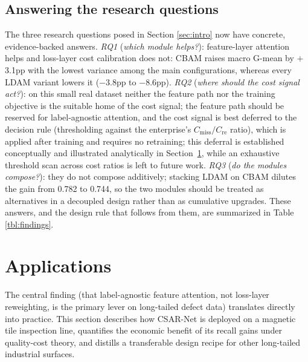 \documentclass[a4paper,fleqn]{cas-sc}
\begin{document}
\begin{sloppypar}
	\subsection{Answering the research questions}
	\par{
		The three research questions posed in Section \ref{sec:intro} now have concrete, evidence-backed answers. \emph{RQ1} (\emph{which module helps?}): feature-layer attention helps and loss-layer cost calibration does not: CBAM raises macro G-mean by $+$3.1pp with the lowest variance among the main configurations, whereas every LDAM variant lowers it ($-$3.8pp to $-$8.6pp). \emph{RQ2} (\emph{where should the cost signal act?}): on this small real dataset neither the feature path nor the training objective is the suitable home of the cost signal; the feature path should be reserved for label-agnostic attention, and the cost signal is best deferred to the decision rule (thresholding against the enterprise's $C_{\mathrm{miss}}/C_{\mathrm{re}}$ ratio), which is applied after training and requires no retraining; this deferral is established conceptually and illustrated analytically in Section~\ref{sec:app}, while an exhaustive threshold scan across cost ratios is left to future work. \emph{RQ3} (\emph{do the modules compose?}): they do not compose additively; stacking LDAM on CBAM dilutes the gain from 0.782 to 0.744, so the two modules should be treated as alternatives in a decoupled design rather than as cumulative upgrades. These answers, and the design rule that follows from them, are summarized in Table \ref{tbl:findings}.
	}

	\clearpage
	\section{Applications}
	\label{sec:app}
	\par{
		The central finding (that label-agnostic feature attention, not loss-layer reweighting, is the primary lever on long-tailed defect data) translates directly into practice. This section describes how CSAR-Net is deployed on a magnetic tile inspection line, quantifies the economic benefit of its recall gains under quality-cost theory, and distills a transferable design recipe for other long-tailed industrial surfaces.
	}


\end{sloppypar}
\end{document}
